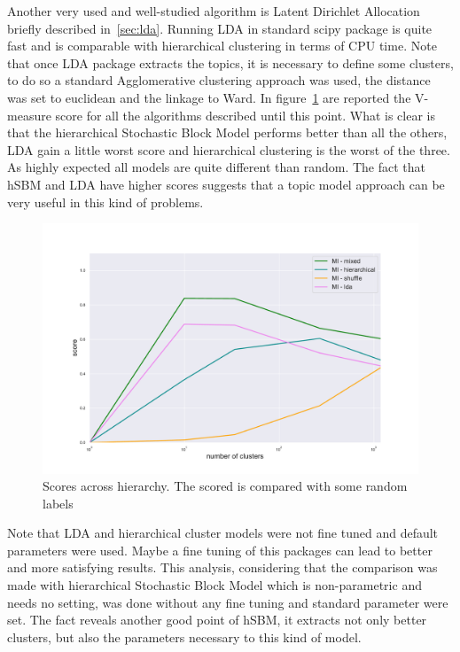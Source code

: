 Another very used and well-studied algorithm is Latent Dirichlet Allocation briefly described in~\ref{sec:lda}. Running LDA in standard scipy package is quite fast and is comparable with hierarchical clustering in terms of CPU time. Note that once LDA package extracts the topics, it is necessary to define some clusters, to do so a standard Agglomerative clustering approach was used, the distance was set to euclidean and the linkage to Ward. In figure~\ref{fig:topic/gtex/oversigma_10tissue/metric_scores_all} are reported the V-measure score for all the algorithms described until this point. What is clear is that the hierarchical Stochastic Block Model performs better than all the others, LDA gain a little worst score and hierarchical clustering is the worst of the three. As highly expected all models are quite different than random. The fact that hSBM and LDA have higher scores suggests that a topic model approach can be very useful in this kind of problems. 
\begin{figure}[htb!]
    \centering
    \includegraphics[width=0.9\linewidth]{pictures/topic/gtex/oversigma_10tissue/metric_scores_all.pdf}
    \caption{Scores across hierarchy. The scored is compared with some random labels}
    \label{fig:topic/gtex/oversigma_10tissue/metric_scores_all}
\end{figure}
Note that LDA and hierarchical cluster models were not fine tuned and default parameters were used. Maybe a fine tuning of this packages can lead to better and more satisfying results. This analysis, considering that the comparison was made with hierarchical Stochastic Block Model which is non-parametric and needs no setting, was done without any fine tuning and standard parameter were set. The fact reveals another good point of hSBM, it extracts not only better clusters, but also the parameters necessary to this kind of model.
\FloatBarrier

